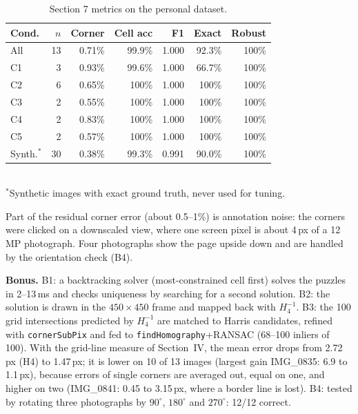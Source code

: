 \documentclass[conference]{IEEEtran}%
\newcommand{\SYNCORNER}{0.38}
\newcommand{\SYNACC}{99.3}
\newcommand{\SYNFONE}{0.991}
\newcommand{\SYNEXACT}{90.0}
\newcommand{\SYNROB}{100}
\begin{document}
\begin{table}[t]
\centering
\caption{Section 7 metrics on the personal dataset.}
\label{tab:results}
\small
\setlength{\tabcolsep}{4pt}
\begin{tabular}{lrrrrrr}
\toprule
Cond. & $n$ & Corner & Cell acc & F1 & Exact & Robust \\
\midrule
All & 13 & 0.71\% & 99.9\% & 1.000 & 92.3\% & 100\% \\
C1 & 3 & 0.93\% & 99.6\% & 1.000 & 66.7\% & 100\% \\
C2 & 6 & 0.65\% & 100\% & 1.000 & 100\% & 100\% \\
C3 & 2 & 0.55\% & 100\% & 1.000 & 100\% & 100\% \\
C4 & 2 & 0.83\% & 100\% & 1.000 & 100\% & 100\% \\
C5 & 2 & 0.57\% & 100\% & 1.000 & 100\% & 100\% \\
\midrule
Synth.$^\ast$ & 30 & \SYNCORNER\% & \SYNACC\% & \SYNFONE & \SYNEXACT\% & \SYNROB\% \\
\bottomrule
\end{tabular}\\[2pt]
\footnotesize $^\ast$Synthetic images with exact ground truth, never used for tuning.
\end{table}

Part of the residual corner error (about 0.5--1\%) is annotation noise: the
corners were clicked on a downscaled view, where one screen pixel is about
4\,px of a 12\,MP photograph. Four photographs show the page upside down and
are handled by the orientation check (B4).

\textbf{Bonus.} B1: a backtracking solver (most-constrained cell first) solves
the puzzles in 2--13\,ms and checks uniqueness by searching for a second
solution. B2: the solution is drawn in the $450\times450$ frame and mapped
back with $H_4^{-1}$. B3: the 100 grid intersections predicted by $H_4^{-1}$
are matched to Harris candidates, refined with \texttt{cornerSubPix} and fed to
\texttt{findHomography}+RANSAC (68--100 inliers of 100). With the grid-line
measure of Section~IV, the mean error drops from 2.72\,px (H4) to 1.47\,px; it
is lower on 10 of 13 images (largest gain IMG\_0835: 6.9 to 1.1\,px), because
errors of single corners are averaged out, equal on one, and higher on two
(IMG\_0841: 0.45 to 3.15\,px, where a border line is lost). B4: tested by rotating three photographs by
$90^\circ$, $180^\circ$ and $270^\circ$: 12/12 correct.

\end{document}
